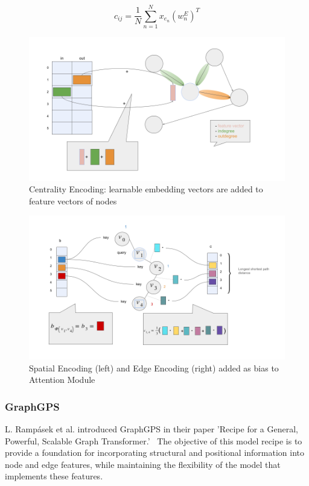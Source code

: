 \begin{equation}
    c_{ij} = \frac{1}{N} \sum_{n=1}^{N} x_{e_n}(w_n^E)^T
\end{equation}

\begin{figure}
    \centering
    \includegraphics[scale=0.4]{tex/res/graphormer_centr_enc.png}
    \caption{Centrality Encoding: learnable embedding vectors are added to feature vectors of nodes}
    \label{fig:graphormer_centr_enc}
\end{figure}

\begin{figure}
    \centering
    \includegraphics[scale=0.4]{tex/res/graphormer_attention.png}
    \caption{Spatial Encoding (left) and Edge Encoding (right) added as bias to Attention Module}
    \label{fig:graphormer_att}
\end{figure}

\subsubsection{GraphGPS}
L. Rampásek et al. introduced GraphGPS in their paper 'Recipe for a General, Powerful, Scalable Graph Transformer.'~\cite{2023graphgps} The objective of this model recipe is to provide a foundation for incorporating structural and positional information into node and edge features, while maintaining the flexibility of the model that implements these features.

